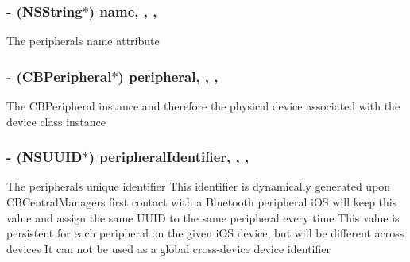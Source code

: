 \subsubsection[{name}]{\setlength{\rightskip}{0pt plus 5cm}-\/ (N\+S\+String$\ast$) name\hspace{0.3cm}{\ttfamily [read]}, {\ttfamily [write]}, {\ttfamily [nonatomic]}, {\ttfamily [strong]}}\label{interface_le_device_a0a263256daa735d19c989c6d884602a2}
The peripheral\textquotesingle{}s name attribute \hypertarget{interface_le_device_a203e77150872db0b9cdb0c2e508de5e3}{}
\subsubsection[{peripheral}]{\setlength{\rightskip}{0pt plus 5cm}-\/ (C\+B\+Peripheral$\ast$) peripheral\hspace{0.3cm}{\ttfamily [read]}, {\ttfamily [write]}, {\ttfamily [nonatomic]}, {\ttfamily [strong]}}\label{interface_le_device_a203e77150872db0b9cdb0c2e508de5e3}
The C\+B\+Peripheral instance and therefore the physical device associated with the device class instance \hypertarget{interface_le_device_ab2c8f700f9c63c327cfefa48df85caaa}{}
\subsubsection[{peripheral\+Identifier}]{\setlength{\rightskip}{0pt plus 5cm}-\/ (N\+S\+U\+U\+I\+D$\ast$) peripheral\+Identifier\hspace{0.3cm}{\ttfamily [read]}, {\ttfamily [write]}, {\ttfamily [nonatomic]}, {\ttfamily [strong]}}\label{interface_le_device_ab2c8f700f9c63c327cfefa48df85caaa}
The peripheral\textquotesingle{}s unique identifier This identifier is dynamically generated upon C\+B\+Central\+Manager\textquotesingle{}s first contact with a Bluetooth peripheral i\+O\+S will keep this value and assign the same U\+U\+I\+D to the same peripheral every time This value is persistent for each peripheral on the given i\+O\+S device, but will be different across devices It can not be used as a global cross-\/device device identifier \hypertarget{interface_le_device_a79b699be0bd017548d1b3537fd2c9f6a}{}
